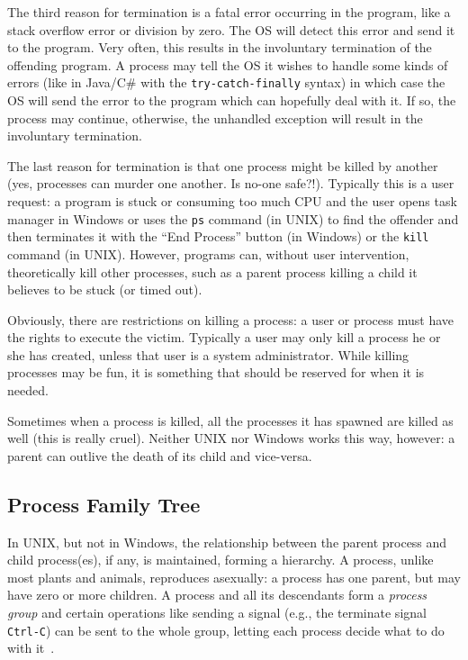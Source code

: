 The third reason for termination is a fatal error occurring in the program, like a stack overflow error or division by zero. The OS will detect this error and send it to the program. Very often, this results in the involuntary termination of the offending program. A process may tell the OS it wishes to handle some kinds of errors (like in Java/C\# with the \texttt{try-catch-finally} syntax) in which case the OS will send the error to the program which can hopefully deal with it. If so, the process may continue, otherwise, the unhandled exception will result in the involuntary termination.

The last reason for termination is that one process might be killed by another (yes, processes can murder one another. Is no-one safe?!). Typically this is a user request: a program is stuck or consuming too much CPU and the user opens task manager in Windows or uses the \texttt{ps} command (in UNIX) to find the offender and then terminates it with the ``End Process'' button (in Windows) or the \texttt{kill} command (in UNIX). However, programs can, without user intervention, theoretically kill other processes, such as a parent process killing a child it believes to be stuck (or timed out).

Obviously, there are restrictions on killing a process: a user or process must have the rights to execute the victim. Typically a user may only kill a process he or she has created, unless that user is a system administrator. While killing processes may be fun, it is something that should be reserved for when it is needed.

Sometimes when a process is killed, all the processes it has spawned are killed as well (this is really cruel). Neither UNIX nor Windows works this way, however: a parent can outlive the death of its child and vice-versa.

\subsection*{Process Family Tree}
In UNIX, but not in Windows, the relationship between the parent process and child process(es), if any, is maintained, forming a hierarchy. A process, unlike most plants and animals, reproduces asexually: a process has one parent, but may have zero or more children. A process and all its descendants form a \textit{process group} and certain operations like sending a signal (e.g., the terminate signal \texttt{Ctrl-C}) can be sent to the whole group, letting each process decide what to do with it~\cite{mos}.

